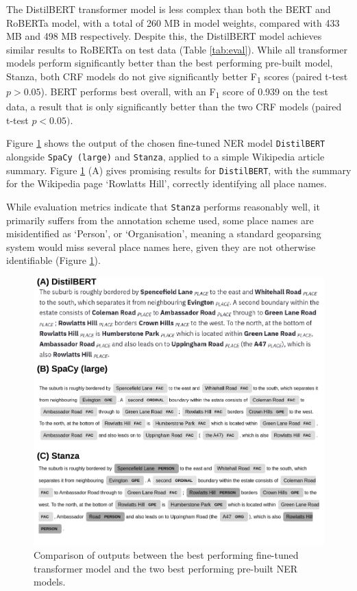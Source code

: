\documentclass[]{interact}
\theoremstyle{plain}%
\theoremstyle{definition}
\theoremstyle{remark}
\begin{document}
The DistilBERT transformer model is less complex than both the BERT and
RoBERTa model, with a total of 260 MB in model weights, compared with
433 MB and 498 MB respectively. Despite this, the DistilBERT model
achieves similar results to RoBERTa on test data (Table \ref{tab:eval}).
While all transformer models perform significantly better than the best
performing pre-built model, Stanza, both CRF models do not give
significantly better F\textsubscript{1} scores (paired t-test
\(p>0.05\)). BERT performs best overall, with an F\textsubscript{1}
score of 0.939 on the test data, a result that is only significantly
better than the two CRF models (paired t-test \(p<0.05)\).

Figure \ref{fig:qual} shows the output of the chosen fine-tuned NER
model \texttt{DistilBERT} alongside \texttt{SpaCy\ (large)} and
\texttt{Stanza}, applied to a simple Wikipedia article summary. Figure
\ref{fig:qual} (A) gives promising results for \texttt{DistilBERT}, with
the summary for the Wikipedia page `Rowlatts Hill', correctly
identifying all place names.

While evaluation metrics indicate that \texttt{Stanza} performs
reasonably well, it primarily suffers from the annotation scheme used,
some place names are misidentified as `Person', or `Organisation',
meaning a standard geoparsing system would miss several place names
here, given they are not otherwise identifiable (Figure \ref{fig:qual}).

\begin{figure}[tb]

{\centering \includegraphics[width=.9\linewidth]{main_files/figure-latex/qual-1} 

}

\caption{Comparison of outputs between the best performing fine-tuned transformer model and the two best performing pre-built NER models.}\label{fig:qual}
\end{figure}
\end{document}
